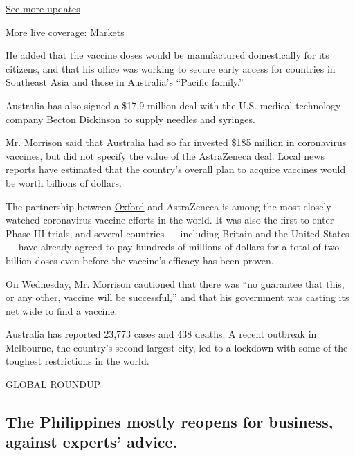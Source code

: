 \href{https://www.nytimes3xbfgragh.onion/2020/08/20/world/coronavirus-covid.html?action=click\&pgtype=Article\&state=default\&region=MAIN_CONTENT_1\&context=storylines_live_updates}{See
more updates}

More live coverage:
\href{https://www.nytimes3xbfgragh.onion/live/2020/08/20/business/stock-market-today-coronavirus?action=click\&pgtype=Article\&state=default\&region=MAIN_CONTENT_1\&context=storylines_live_updates}{Markets}

He added that the vaccine doses would be manufactured domestically for
its citizens, and that his office was working to secure early access for
countries in Southeast Asia and those in Australia's ``Pacific family.''

Australia has also signed a \$17.9 million deal with the U.S. medical
technology company Becton Dickinson to supply needles and syringes.

Mr. Morrison said that Australia had so far invested \$185 million in
coronavirus vaccines, but did not specify the value of the AstraZeneca
deal. Local news reports have estimated that the country's overall plan
to acquire vaccines would be worth
\href{https://www.abc.net.au/news/2020-08-18/australia-locks-in-oxford-astrazeneca-coronavirus-vaccine-deal/12571454}{billions
of dollars}.

The partnership between
\href{https://www.nytimes3xbfgragh.onion/2020/04/27/world/europe/coronavirus-vaccine-update-oxford.html}{Oxford}
and AstraZeneca is among the most closely watched coronavirus vaccine
efforts in the world. It was also the first to enter Phase III trials,
and several countries --- including Britain and the United States ---
have already agreed to pay hundreds of millions of dollars for a total
of two billion doses even before the vaccine's efficacy has been proven.

On Wednesday, Mr. Morrison cautioned that there was ``no guarantee that
this, or any other, vaccine will be successful,'' and that his
government was casting its net wide to find a vaccine.

Australia has reported 23,773 cases and 438 deaths. A recent outbreak in
Melbourne, the country's second-largest city, led to a lockdown with
some of the toughest restrictions in the world.

GLOBAL ROUNDUP

\hypertarget{the-philippines-mostly-reopens-for-business-against-experts-advice}{%
\subsection{The Philippines mostly reopens for business, against
experts'
advice.}\label{the-philippines-mostly-reopens-for-business-against-experts-advice}}

